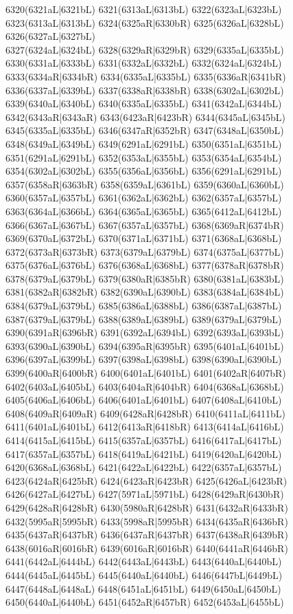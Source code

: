 6320(6321aL|6321bL) 6321(6313aL|6313bL) 6322(6323aL|6323bL) 6323(6313aL|6313bL) 6324(6325aR|6330bR) 6325(6326aL|6328bL) 6326(6327aL|6327bL) \\6327(6324aL|6324bL) 6328(6329aR|6329bR) 6329(6335aL|6335bL) 6330(6331aL|6333bL) 6331(6332aL|6332bL) 6332(6324aL|6324bL) 6333(6334aR|6334bR) 6334(6335aL|6335bL) 6335(6336aR|6341bR) \\6336(6337aL|6339bL) 6337(6338aR|6338bR) 6338(6302aL|6302bL) 6339(6340aL|6340bL) 6340(6335aL|6335bL) 6341(6342aL|6344bL) 6342(6343aR|6343aR) 6343(6423aR|6423bR) 6344(6345aL|6345bL) \\6345(6335aL|6335bL) 6346(6347aR|6352bR) 6347(6348aL|6350bL) 6348(6349aL|6349bL) 6349(6291aL|6291bL) 6350(6351aL|6351bL) 6351(6291aL|6291bL) 6352(6353aL|6355bL) 6353(6354aL|6354bL) \\6354(6302aL|6302bL) 6355(6356aL|6356bL) 6356(6291aL|6291bL) 6357(6358aR|6363bR) 6358(6359aL|6361bL) 6359(6360aL|6360bL) 6360(6357aL|6357bL) 6361(6362aL|6362bL) 6362(6357aL|6357bL) \\6363(6364aL|6366bL) 6364(6365aL|6365bL) 6365(6412aL|6412bL) 6366(6367aL|6367bL) 6367(6357aL|6357bL) 6368(6369aR|6374bR) 6369(6370aL|6372bL) 6370(6371aL|6371bL) 6371(6368aL|6368bL) \\6372(6373aR|6373bR) 6373(6379aL|6379bL) 6374(6375aL|6377bL) 6375(6376aL|6376bL) 6376(6368aL|6368bL) 6377(6378aR|6378bR) 6378(6379aL|6379bL) 6379(6380aR|6385bR) 6380(6381aL|6383bL) \\6381(6382aR|6382bR) 6382(6390aL|6390bL) 6383(6384aL|6384bL) 6384(6379aL|6379bL) 6385(6386aL|6388bL) 6386(6387aL|6387bL) 6387(6379aL|6379bL) 6388(6389aL|6389bL) 6389(6379aL|6379bL) \\6390(6391aR|6396bR) 6391(6392aL|6394bL) 6392(6393aL|6393bL) 6393(6390aL|6390bL) 6394(6395aR|6395bR) 6395(6401aL|6401bL) 6396(6397aL|6399bL) 6397(6398aL|6398bL) 6398(6390aL|6390bL) \\6399(6400aR|6400bR) 6400(6401aL|6401bL) 6401(6402aR|6407bR) 6402(6403aL|6405bL) 6403(6404aR|6404bR) 6404(6368aL|6368bL) 6405(6406aL|6406bL) 6406(6401aL|6401bL) 6407(6408aL|6410bL) \\6408(6409aR|6409aR) 6409(6428aR|6428bR) 6410(6411aL|6411bL) 6411(6401aL|6401bL) 6412(6413aR|6418bR) 6413(6414aL|6416bL) 6414(6415aL|6415bL) 6415(6357aL|6357bL) 6416(6417aL|6417bL) \\6417(6357aL|6357bL) 6418(6419aL|6421bL) 6419(6420aL|6420bL) 6420(6368aL|6368bL) 6421(6422aL|6422bL) 6422(6357aL|6357bL) 6423(6424aR|6425bR) 6424(6423aR|6423bR) 6425(6426aL|6423bR) \\6426(6427aL|6427bL) 6427(5971aL|5971bL) 6428(6429aR|6430bR) 6429(6428aR|6428bR) 6430(5980aR|6428bR) 6431(6432aR|6433bR) 6432(5995aR|5995bR) 6433(5998aR|5995bR) 6434(6435aR|6436bR) \\6435(6437aR|6437bR) 6436(6437aR|6437bR) 6437(6438aR|6439bR) 6438(6016aR|6016bR) 6439(6016aR|6016bR) 6440(6441aR|6446bR) 6441(6442aL|6444bL) 6442(6443aL|6443bL) 6443(6440aL|6440bL) \\6444(6445aL|6445bL) 6445(6440aL|6440bL) 6446(6447bL|6449bL) 6447(6448aL|6448aL) 6448(6451aL|6451bL) 6449(6450aL|6450bL) 6450(6440aL|6440bL) 6451(6452aR|6457bR) 6452(6453aL|6455bL) 